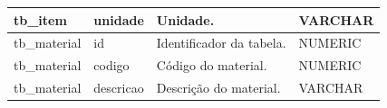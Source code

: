 \begin{landscape}
\begin{table}[ht]
\begin{tabular}{|l|l|l|l|}
	tb\_item       & unidade                   & Unidade.                                                               & VARCHAR      \\ \hline
	tb\_material   & id                        & Identificador da tabela.                                               & NUMERIC      \\ \hline
	tb\_material   & codigo                    & Código do material.                                                    & NUMERIC      \\ \hline
	tb\_material   & descricao                 & Descrição do material.                                                 & VARCHAR      \\ \hline
\end{tabular}

\end{table}
\end{landscape}

